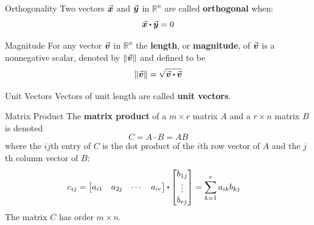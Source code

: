 \documentclass{beamer}
\begin{document}
\begin{frame}
\begin{block}{Orthogonality}
Two vectors ${\vec{\boldsymbol{x}}}$ and ${\vec{\boldsymbol{y}}}$ in $\mathbb{R}^n$ are called \textbf{orthogonal} when:
\begin{equation*}
\vect{x}\pdot\vect{y}=0
\end{equation*}
\end{block}\pause
\begin{block}{Magnitude}
For any vector ${\vec{\boldsymbol{v}}}$ in $\mathbb{R}^n$ the \textbf{length}, or \textbf{magnitude}, of ${\vec{\boldsymbol{v}}}$ is a nonnegative scalar, denoted by ${\left\lVert {\vec{\boldsymbol{v}}}\right\rVert}$ and defined to be
\begin{equation*}
\vabs{\vect{v}}=\sqrt{\vect{v}\pdot \vect{v}}
\end{equation*}
\end{block}\pause
\begin{block}{Unit Vectors}
Vectors of unit length are called \textbf{unit vectors}.
\end{block}
\end{frame}

\begin{frame}
\begin{block}{Matrix Product}
The \textbf{matrix product} of a $m\times r$ matrix $A$ and a $r\times n$ matrix $B$ is denoted
\begin{equation*}
C=A\cdot B=AB
\end{equation*}
where the $ij$th entry of $C$ is the dot product of the $i$th row vector of $A$ and the $j$th column vector of $B$:
\begin{equation*}
\begin{split}
c_{ij}&=\begin{bmatrix}a_{i1}&a_{2j}&\cdots&a_{ir}\end{bmatrix}\pdot
\begin{bmatrix}b_{1j}\\\vdots\\b_{rj}\end{bmatrix}
=\sum_{k=1}^{r}a_{ik}b_{kj}
\end{split}
\end{equation*}
The matrix $C$ has order $m\times n$.
\end{block}
\end{frame}
\end{document}
